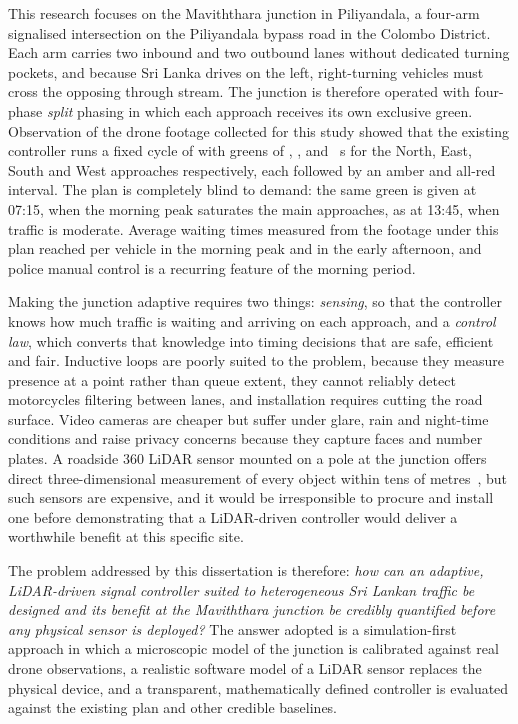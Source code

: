 This research focuses on the Maviththara junction in Piliyandala, a four-arm signalised intersection on the Piliyandala bypass road in the Colombo District. Each arm carries two inbound and two outbound lanes without dedicated turning pockets, and because Sri Lanka drives on the left, right-turning vehicles must cross the opposing through stream. The junction is therefore operated with four-phase \emph{split} phasing in which each approach receives its own exclusive green. Observation of the drone footage collected for this study showed that the existing controller runs a fixed cycle of  with greens of , ,  and ~s for the North, East, South and West approaches respectively, each followed by an amber and all-red interval. The plan is completely blind to demand: the same green is given at 07:15, when the morning peak saturates the main approaches, as at 13:45, when traffic is moderate. Average waiting times measured from the footage under this plan reached  per vehicle in the morning peak and  in the early afternoon, and police manual control is a recurring feature of the morning period.

Making the junction adaptive requires two things: \emph{sensing}, so that the controller knows how much traffic is waiting and arriving on each approach, and a \emph{control law}, which converts that knowledge into timing decisions that are safe, efficient and fair. Inductive loops are poorly suited to the problem, because they measure presence at a point rather than queue extent, they cannot reliably detect motorcycles filtering between lanes, and installation requires cutting the road surface. Video cameras are cheaper but suffer under glare, rain and night-time conditions and raise privacy concerns because they capture faces and number plates. A roadside 360\textdegree{} LiDAR sensor mounted on a pole at the junction offers direct three-dimensional measurement of every object within tens of metres~\cite{zhao2019lidar,lv2019lidar}, but such sensors are expensive, and it would be irresponsible to procure and install one before demonstrating that a LiDAR-driven controller would deliver a worthwhile benefit at this specific site.

The problem addressed by this dissertation is therefore: \emph{how can an adaptive, LiDAR-driven signal controller suited to heterogeneous Sri Lankan traffic be designed and its benefit at the Maviththara junction be credibly quantified before any physical sensor is deployed?} The answer adopted is a simulation-first approach in which a microscopic model of the junction is calibrated against real drone observations, a realistic software model of a LiDAR sensor replaces the physical device, and a transparent, mathematically defined controller is evaluated against the existing plan and other credible baselines.

